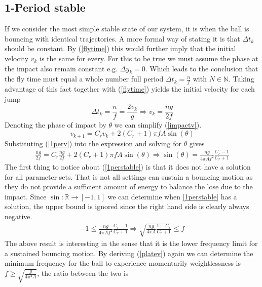\documentclass[12pt,oneside,a4paper]{article}
\numberwithin{equation}{section}
\begin{document}
{{{{\subsection{1-Period stable}
If we consider the most simple stable state of our system, it is when the ball is bouncing with identical trajectories. A more formal way of stating it is that $\Delta t_k$ should be constant. By  (\ref{flytime}) this would further imply that the initial velocity $v_k$ is the same for every. For this to be true we must assume the phase at the impact also remain constant e.g. $\Delta y_k=0$. Which leads to the conclusion that the fly time must equal a whole number full period $\Delta t_k = \frac{n}{f}$ with $N\in \mathbb{N}$. Taking advantage of this fact together with (\ref{flytime}) yields the initial velocity for each jump
\begin{equation}
	\Delta t_k = \frac{n}{f} = \frac{2v_k}{g} \Rightarrow v_k = \frac{ng}{2f}
	\label{1perv}
\end{equation}
Denoting the phase of impact by $\theta$ we can simplify (\ref{impactv}).
\begin{equation}
	v_{k+1} = C_rv_k+2(C_r+1)\pi fA \sin(\theta)
\end{equation}
Substituting (\ref{1perv}) into the expression and solving for $\theta$ gives
\begin{align}
	\frac{ng}{2f} = C_r\frac{ng}{2f}+2(C_r+1)\pi fA \sin(\theta) \Rightarrow \sin(\theta) = \frac{ng}{4\pi Af^2 }\frac{C_r-1}{C_r+1}
	\label{1perstable}
\end{align}
The first thing to notice about (\ref{1perstable}) is that it does not have a solution for all parameter sets. That is not all settings can sustain a bouncing motion as they do not provide a sufficient amount of energy to balance the lose due to the impact. Since $\sin: \mathbb{R} \rightarrow [-1,1]$ we can determine when \eqref{1perstable} has a solution, the upper bound is ignored since the right hand side is clearly always negative.
\begin{align}
	-1 \le \frac{ng}{4\pi Af^2 }\frac{C_r-1}{C_r+1} \Rightarrow \sqrt{\frac{ng}{4\pi A}\frac{1-C_r}{C_r+1}} \le f
\end{align}
The above result is interesting in the sense that it is the lower frequency limit for a sustained bouncing motion. By deriving (\ref{platev}) again we can determine the minimum frequency for the ball to experience momentarily weightlessness is $f\ge\sqrt{\frac{g}{4\pi^2A}}$, the ratio between the two is
\begin{equation}

\end{equation}}}}}
\end{document}
